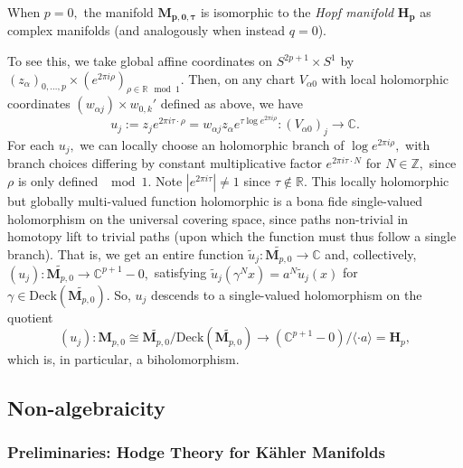 \begin{example}
    When $p=0,$ the manifold $\mathbf{M_{p,0, \tau}}$ is isomorphic to the \textit{Hopf manifold} $\mathbf{H_{p}}$ as complex manifolds (and analogously when instead $q=0$).
    
    To see this, we take global affine coordinates on $S^{2p+1}\times S^1$ by $(z_\alpha)_{0,\dots, p}\times (e^{2\pi i \rho})_{\rho \in \mathbb{R} \mod 1}.$ Then, on any chart $V_{\alpha 0}$ with local holomorphic coordinates $(w_{\alpha j})\times w_{0,k}'$ defined as above, we have
    \[
    u_j := z_j e^{2\pi i \tau \cdot \rho} = w_{\alpha j}z_\alpha e^{\tau \log e^{2\pi i \rho}}: (V_{\alpha 0})_j\to \mathbb{C}.
    \]
    For each $u_j,$ we can locally choose an holomorphic branch of $\log e^{2\pi i\rho},$ with branch choices differing by constant multiplicative factor $e^{2\pi i \tau \cdot N}$ for $N\in \mathbb{Z},$ since $\rho$ is only defined $\mod 1.$ Note $|e^{2\pi i \tau}|\neq 1$ since $\tau \notin \mathbb{R}.$ This locally holomorphic but globally multi-valued function holomorphic is a bona fide single-valued holomorphism on the universal covering space, since paths non-trivial in homotopy lift to trivial paths (upon which the function must thus follow a single branch). That is, we get an entire function $\widetilde u_j: \widetilde{\mathbf{M}_{p,0}} \to \mathbb{C}$ and, collectively, $(u_j):  \widetilde{\mathbf{M}_{p,0}} \to \mathbb{C}^{p+1}-0,$ satisfying $\widetilde u_j(\gamma^Nx) = a^N \widetilde u_j(x)$ for $\gamma \in \mathrm{Deck}(\widetilde{\mathbf{M}_{p,0}}).$ So, $u_j$ descends to a single-valued holomorphism on the quotient
    \[
    (u_j): \mathbf{M}_{p,0} \cong  \widetilde{\mathbf{M}_{p,0}}/\mathrm{Deck}(\widetilde{\mathbf{M}_{p,0}}) \to (\mathbb{C}^{p+1}-0)/\langle \cdot a\rangle = \mathbf{H}_{p},
    \]
    which is, in particular, a biholomorphism.

\end{example}


\subsection{Non-algebraicity}

\subsubsection{Preliminaries: Hodge Theory for K\"ahler Manifolds}

